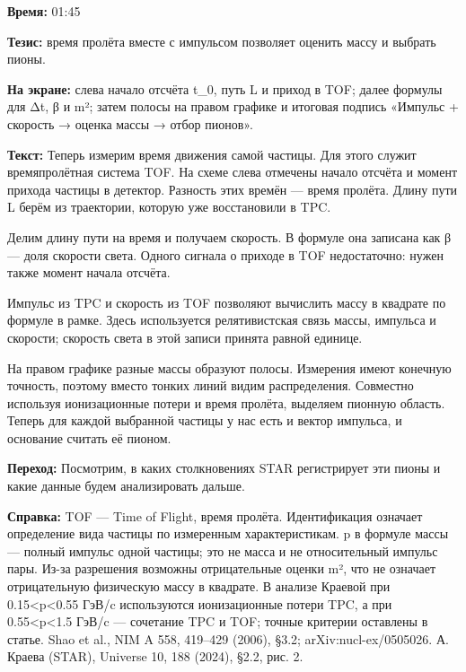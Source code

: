 \textbf{Время:} 01:45

\textbf{Тезис:} время пролёта вместе с импульсом позволяет оценить массу и выбрать пионы.

\textbf{На экране:} слева начало отсчёта t\_0, путь L и приход в TOF; далее формулы для Δt, β и m²; затем полосы на правом графике и итоговая подпись «Импульс + скорость → оценка массы → отбор пионов».

\textbf{Текст:} Теперь измерим время движения самой частицы. Для этого служит времяпролётная система TOF. На схеме слева отмечены начало отсчёта и момент прихода частицы в детектор. Разность этих времён — время пролёта. Длину пути L берём из траектории, которую уже восстановили в TPC.

Делим длину пути на время и получаем скорость. В формуле она записана как β — доля скорости света. Одного сигнала о приходе в TOF недостаточно: нужен также момент начала отсчёта.

Импульс из TPC и скорость из TOF позволяют вычислить массу в квадрате по формуле в рамке. Здесь используется релятивистская связь массы, импульса и скорости; скорость света в этой записи принята равной единице.

На правом графике разные массы образуют полосы. Измерения имеют конечную точность, поэтому вместо тонких линий видим распределения. Совместно используя ионизационные потери и время пролёта, выделяем пионную область. Теперь для каждой выбранной частицы у нас есть и вектор импульса, и основание считать её пионом.

\textbf{Переход:} Посмотрим, в каких столкновениях STAR регистрирует эти пионы и какие данные будем анализировать дальше.

\textbf{Справка:} TOF — Time of Flight, время пролёта. Идентификация означает определение вида частицы по измеренным характеристикам. p в формуле массы — полный импульс одной частицы; это не масса и не относительный импульс пары. Из-за разрешения возможны отрицательные оценки m², что не означает отрицательную физическую массу в квадрате. В анализе Краевой при 0.15<p<0.55 ГэВ/c используются ионизационные потери TPC, а при 0.55<p<1.5 ГэВ/c — сочетание TPC и TOF; точные критерии оставлены в статье. Shao et al., NIM A 558, 419–429 (2006), §3.2; arXiv:nucl-ex/0505026. А. Краева (STAR), Universe 10, 188 (2024), §2.2, рис. 2.
